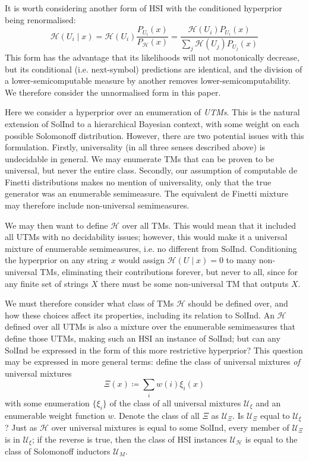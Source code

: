 \documentclass[11pt]{article}
\newcommand{\Eta}{\mathcal{H}}
\begin{document}
It is worth considering another form of HSI with the conditioned hyperprior being renormalised:
\begin{equation}
\label{eq:eta-normalised}
    \Eta(U_i \mid x) = \Eta(U_i) \frac{P_{U_i}(x)}{P_\Eta(x)} = \frac{\Eta(U_i) P_{U_i}(x)}{\sum_j \Eta(U_j) P_{U_j}(x)}
\end{equation}
This form has the advantage that its likelihoods will not monotonically decrease, but its conditional (i.e. next-symbol) predictions are identical, and the division of a lower-semicomputable measure by another removes lower-semicomputability.
We therefore consider the unnormalised form in this paper.

Here we consider a hyperprior over an enumeration of \textit{UTMs}. This is the natural extension of SolInd to a hierarchical Bayesian context, with some weight on each possible Solomonoff distribution.
However, there are two potential issues with this formulation.
Firstly, universality (in all three senses described above) is undecidable in general. We may enumerate TMs that can be proven to be universal, but never the entire class.
Secondly, our assumption of computable de Finetti distributions makes no mention of universality, only that the true generator was an enumerable semimeasure. The equivalent de Finetti mixture may therefore include non-universal semimeasures.

We may then want to define $\Eta$ over all TMs. This would mean that it included all UTMs with no decidability issues; however, this would make it a universal mixture of enumerable semimeasures, i.e. no different from SolInd.
Conditioning the hyperprior on any string $x$ would assign $\Eta(U\mid x)=0$ to many non-universal TMs, eliminating their contributions forever, but never to all, since for any finite set of strings $X$ there must be some non-universal TM that outputs $X$.

We must therefore consider what class of TMs $\Eta$ should be defined over, and how these choices affect its properties, including its relation to SolInd.
An $\Eta$ defined over all UTMs is also a mixture over the enumerable semimeasures that define those UTMs, making such an HSI an instance of SolInd; but can any SolInd be expressed in the form of this more restrictive hyperprior?
This question may be expressed in more general terms: define the class of universal mixtures \textit{of} universal mixtures
\[
    \Xi(x) \coloneq \sum_i w(i)\xi_i(x)
\]
with some enumeration $\{\xi_i\}$ of the class of all universal mixtures $\mathcal{U}_\xi$ and an enumerable weight function $w$.
Denote the class of all $\Xi$ as $\mathcal{U}_\Xi$.
Is $\mathcal{U}_\Xi$ equal to $\mathcal{U}_\xi$?
Just as $\Eta$ over universal mixtures is equal to some SolInd, every member of $\mathcal{U}_\Xi$ is in $\mathcal{U}_\xi$; if the reverse is true, then the class of HSI instances $\mathcal{U}_\Eta$ is equal to the class of Solomonoff inductors $\mathcal{U}_M$.
\end{document}
